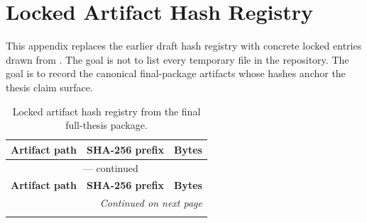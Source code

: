 \chapter{Locked Artifact Hash Registry}
\label{app:locked-hash-registry}

This appendix replaces the earlier draft hash registry with concrete locked
entries drawn from
.  The goal is
not to list every temporary file in the repository.  The goal is to record
the canonical final-package artifacts whose hashes anchor the thesis claim
surface.

\begin{small}
\begin{longtable}{@{}p{8.0cm}p{3.1cm}p{1.6cm}@{}}
\caption{Locked artifact hash registry from the final full-thesis package.}
\label{tab:locked-hash-registry} \\
\toprule
\textbf{Artifact path} & \textbf{SHA-256 prefix} & \textbf{Bytes} \\
\midrule
\endfirsthead

\multicolumn{3}{c}{\tablename\ \thetable{} --- continued} \\
\toprule
\textbf{Artifact path} & \textbf{SHA-256 prefix} & \textbf{Bytes} \\
\midrule
\endhead

\midrule
\multicolumn{3}{r}{\textit{Continued on next page}} \\
\endfoot

\bottomrule
\endlastfoot


\end{longtable}
\end{small}
